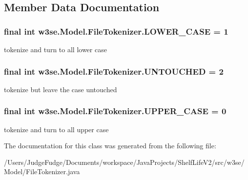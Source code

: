 \subsection{Member Data Documentation}
\hypertarget{classw3se_1_1_model_1_1_file_tokenizer_aa0a435e28809cae13036f6fe33f9d4b8}{
\subsubsection[{L\-O\-W\-E\-R\-\_\-\-C\-A\-S\-E}]{\setlength{\rightskip}{0pt plus 5cm}final int w3se.\-Model.\-File\-Tokenizer.\-L\-O\-W\-E\-R\-\_\-\-C\-A\-S\-E = 1\hspace{0.3cm}{\ttfamily [static]}}}\label{classw3se_1_1_model_1_1_file_tokenizer_aa0a435e28809cae13036f6fe33f9d4b8}
tokenize and turn to all lower case \hypertarget{classw3se_1_1_model_1_1_file_tokenizer_a7dba841c4633f0a223f2ed77fea9a19d}{
\subsubsection[{U\-N\-T\-O\-U\-C\-H\-E\-D}]{\setlength{\rightskip}{0pt plus 5cm}final int w3se.\-Model.\-File\-Tokenizer.\-U\-N\-T\-O\-U\-C\-H\-E\-D = 2\hspace{0.3cm}{\ttfamily [static]}}}\label{classw3se_1_1_model_1_1_file_tokenizer_a7dba841c4633f0a223f2ed77fea9a19d}
tokenize but leave the case untouched \hypertarget{classw3se_1_1_model_1_1_file_tokenizer_a7d4acc9794a367b9b4b713ee30538a9e}{
\subsubsection[{U\-P\-P\-E\-R\-\_\-\-C\-A\-S\-E}]{\setlength{\rightskip}{0pt plus 5cm}final int w3se.\-Model.\-File\-Tokenizer.\-U\-P\-P\-E\-R\-\_\-\-C\-A\-S\-E = 0\hspace{0.3cm}{\ttfamily [static]}}}\label{classw3se_1_1_model_1_1_file_tokenizer_a7d4acc9794a367b9b4b713ee30538a9e}
tokenize and turn to all upper case 

The documentation for this class was generated from the following file\-:\begin{DoxyCompactItemize}
\item 
/\-Users/\-Judge\-Fudge/\-Documents/workspace/\-Java\-Projects/\-Shelf\-Life\-V2/src/w3se/\-Model/File\-Tokenizer.\-java\end{DoxyCompactItemize}
